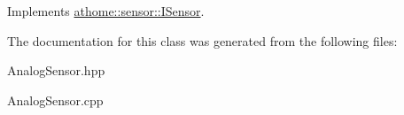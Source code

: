 Implements \mbox{\hyperlink{classathome_1_1sensor_1_1_i_sensor_a2513fd8acc5d8251439330ca0e78cf04}{athome\+::sensor\+::\+I\+Sensor}}.



The documentation for this class was generated from the following files\+:\begin{DoxyCompactItemize}
\item 
Analog\+Sensor.\+hpp\item 
Analog\+Sensor.\+cpp\end{DoxyCompactItemize}
